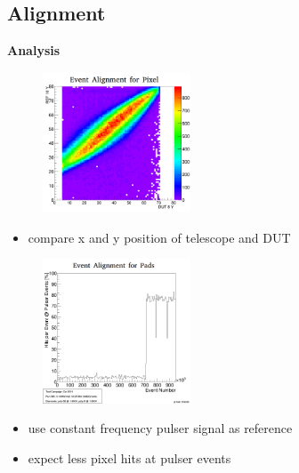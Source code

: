 \documentclass[9pt]{beamer}
\begin{document}
\subsection{Alignment}
\begin{frame}
	\begin{alertblock}{
		\centering
		\Large{\textbf{Analysis}}}
	\end{alertblock}
	\begin{center}
		\begin{minipage}{5.5cm}
			\centering
			\begin{figure}
				\includegraphics[width=4.4cm]{Pics/correlation2y}
			\end{figure}
			\begin{itemize}
				\item compare x and y position of telescope and DUT
			\end{itemize}
		\end{minipage}
		\hspace*{2pt}
		\begin{minipage}{5.5cm}
			\centering
			\begin{figure}
				\includegraphics[width=4.4cm]{Pics/EventAlignment}
			\end{figure}
			\begin{itemize}
				\item use constant frequency pulser signal as reference
				\item expect less pixel hits at pulser events
			\end{itemize}
		\end{minipage}
	\end{center}
\end{frame}
\end{document}
